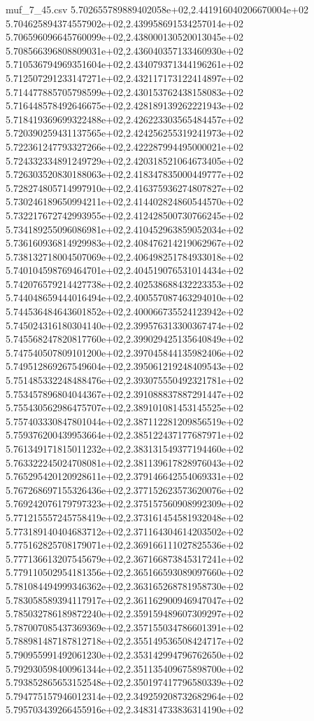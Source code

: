 \begin{filecontents*}{muf_7_45.csv}
5.702655789889402058e+02,2.441916040206670004e+02
5.704625894374557902e+02,2.439958691534257014e+02
5.706596096645760099e+02,2.438000130520013045e+02
5.708566396808809031e+02,2.436040357133460930e+02
5.710536794969351604e+02,2.434079371344196261e+02
5.712507291233147271e+02,2.432117173122414897e+02
5.714477885705798599e+02,2.430153762438158083e+02
5.716448578492646675e+02,2.428189139262221943e+02
5.718419369699322488e+02,2.426223303565484457e+02
5.720390259431137565e+02,2.424256255319241973e+02
5.722361247793327266e+02,2.422287994495000021e+02
5.724332334891249729e+02,2.420318521064673405e+02
5.726303520830188063e+02,2.418347835000449777e+02
5.728274805714997910e+02,2.416375936274807827e+02
5.730246189650994211e+02,2.414402824860544570e+02
5.732217672742993955e+02,2.412428500730766245e+02
5.734189255096086981e+02,2.410452963859052034e+02
5.736160936814929983e+02,2.408476214219062967e+02
5.738132718004507069e+02,2.406498251784933018e+02
5.740104598769464701e+02,2.404519076531014434e+02
5.742076579214427738e+02,2.402538688432223353e+02
5.744048659444016494e+02,2.400557087463294010e+02
5.744536484643601852e+02,2.400066735524123942e+02
5.745024316180304140e+02,2.399576313300367474e+02
5.745568247820817760e+02,2.399029425135640849e+02
5.747540507809101200e+02,2.397045844135982406e+02
5.749512869267549604e+02,2.395061219248409543e+02
5.751485332248488476e+02,2.393075550492321781e+02
5.753457896804044367e+02,2.391088837887291447e+02
5.755430562986475707e+02,2.389101081453145525e+02
5.757403330847801044e+02,2.387112281209856519e+02
5.759376200439953664e+02,2.385122437177687971e+02
5.761349171815011232e+02,2.383131549377194460e+02
5.763322245024708081e+02,2.381139617828976043e+02
5.765295420120928611e+02,2.379146642554069331e+02
5.767268697155326436e+02,2.377152623573620076e+02
5.769242076179797323e+02,2.375157560908992309e+02
5.771215557245758419e+02,2.373161454581932048e+02
5.773189140404683712e+02,2.371164304614203502e+02
5.775162825708179071e+02,2.369166111027825536e+02
5.777136613207545679e+02,2.367166873845317241e+02
5.779110502954181356e+02,2.365166593089097660e+02
5.781084494999346362e+02,2.363165268781958730e+02
5.783058589394117917e+02,2.361162900946947047e+02
5.785032786189872240e+02,2.359159489607309297e+02
5.787007085437369369e+02,2.357155034786601391e+02
5.788981487187812718e+02,2.355149536508424717e+02
5.790955991492061230e+02,2.353142994796762650e+02
5.792930598400961344e+02,2.351135409675898700e+02
5.793852865653152548e+02,2.350197417796580339e+02
5.794775157946012314e+02,2.349259208732682964e+02
5.795703439266455916e+02,2.348314733836314190e+02

\end{filecontents*}

